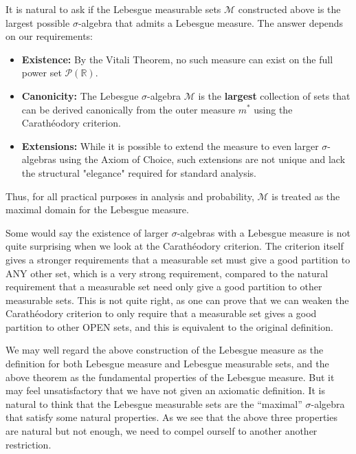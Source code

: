 \documentclass[../main.tex]{subfiles}
\begin{document}
\begin{remark}
    It is natural to ask if the Lebesgue measurable sets $\mathcal{M}$ constructed above is the largest possible $\sigma$-algebra that admits a Lebesgue measure. The answer depends on our requirements:
    \begin{itemize}
        \item \textbf{Existence:} By the Vitali Theorem, no such measure can exist on the full power set $\mathcal{P}(\mathbb{R})$.
        \item \textbf{Canonicity:} The Lebesgue $\sigma$-algebra $\mathcal{M}$ is the \textbf{largest} collection of sets that can be derived canonically from the outer measure $m^*$ using the Carathéodory criterion. 
        \item \textbf{Extensions:} While it is possible to extend the measure to even larger $\sigma$-algebras using the Axiom of Choice, such extensions are not unique and lack the structural "elegance" required for standard analysis.
    \end{itemize}
    Thus, for all practical purposes in analysis and probability, $\mathcal{M}$ is treated as the maximal domain for the Lebesgue measure.

    Some would say the existence of larger $\sigma$-algebras with a Lebesgue measure is not quite surprising when we look at the Carathéodory criterion. The criterion itself gives a stronger requirements that a measurable set must give a good partition to ANY other set, which is a very strong requirement, compared to the natural requirement that a measurable set need only give a good partition to other measurable sets. This is not quite right, as one can prove that we can weaken the Carathéodory criterion to only require that a measurable set gives a good partition to other OPEN sets, and this is equivalent to the original definition.

    We may well regard the above construction of the Lebesgue measure as the definition for both Lebesgue measure and Lebesgue measurable sets, and the above theorem as the fundamental properties of the Lebesgue measure. But it may feel unsatisfactory that we have not given an axiomatic definition. It is natural to think that the Lebesgue measurable sets are the ``maximal'' $\sigma$-algebra that satisfy some natural properties. As we see that the above three properties are natural but not enough, we need to compel ourself to another another restriction.
\end{remark}
\end{document}
